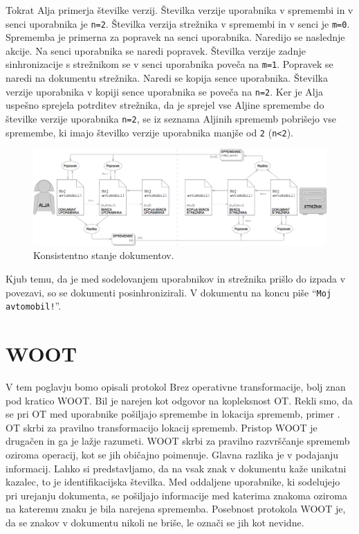 \documentclass[a4paper, 12pt, twoside]{book}
\begin{document}
Tokrat Alja primerja številke verzij. Številka verzije uporabnika v spremembi in v senci uporabnika je {\tt n=2}. Številka verzija strežnika v spremembi in v senci je {\tt m=0}. Sprememba je primerna za popravek na senci uporabnika. Naredijo se naslednje akcije. Na senci uporabnika se naredi popravek. Številka verzije zadnje sinhronizacije s strežnikom se v senci uporabnika poveča na {\tt m=1}. Popravek se naredi na dokumentu strežnika. Naredi se kopija sence uporabnika. Številka verzije uporabnika v kopiji sence uporabnika se poveča na {\tt n=2}. Ker je Alja uspešno sprejela potrditev strežnika, da je sprejel vse Aljine spremembe do številke verzije uporabnika {\tt n=2}, se iz seznama Aljinih sprememb pobrišejo vse spremembe, ki imajo številko verzije uporabnika manjše od {\tt 2} ({\tt n<2}).

\begin{figure}[placement h]
\begin{center}
\includegraphics[width=16cm]{ds10.png}
\end{center}
\caption{Konsistentno stanje dokumentov.}
\label{ds10}
\end{figure}

Kjub temu, da je med sodelovanjem uporabnikov in strežnika prišlo do izpada v povezavi, so se dokumenti posinhronizirali. V dokumentu na koncu piše “{\tt Moj avtomobil!}”.

\section{WOOT}

V tem poglavju bomo opisali protokol Brez operativne transformacije, bolj znan pod kratico WOOT. Bil je narejen kot odgovor na kopleksnost OT. Rekli smo, da se \linebreak pri OT med uporabnike pošiljajo spremembe in lokacija sprememb, primer . OT skrbi za pravilno transformacijo lokacij sprememb. Pristop WOOT je drugačen in ga je lažje razumeti. WOOT skrbi za pravilno razvrščanje sprememb oziroma operacij, kot se jih običajno poimenuje. Glavna razlika je v podajanju informacij. Lahko si predstavljamo, da na vsak znak v dokumentu kaže unikatni kazalec, to je identifikacijska številka. Med oddaljene uporabnike, ki sodelujejo pri urejanju dokumenta, se pošiljajo informacije med katerima znakoma oziroma na kateremu znaku je bila narejena sprememba. Posebnost protokola WOOT je, da se znakov v dokumentu nikoli ne briše, le označi se jih kot nevidne.
\end{document}
